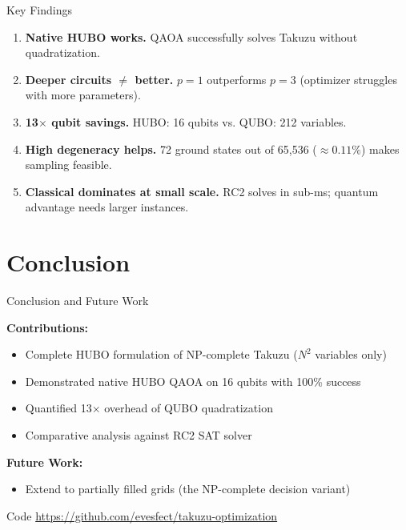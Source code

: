\documentclass[aspectratio=169]{beamer}
\begin{document}
\begin{frame}{Key Findings}

\begin{enumerate}
    \item \textbf{Native HUBO works.} QAOA successfully solves Takuzu without quadratization.
    
    \bigskip
    \item \textbf{Deeper circuits $\neq$ better.} $p=1$ outperforms $p=3$ (optimizer struggles with more parameters).
    
    \bigskip
    \item \textbf{13$\times$ qubit savings.} HUBO: 16 qubits vs. QUBO: 212 variables.
    
    \bigskip
    \item \textbf{High degeneracy helps.} 72 ground states out of 65,536 ($\approx 0.11\%$) makes sampling feasible.
    
    \bigskip
    \item \textbf{Classical dominates at small scale.} RC2 solves in sub-ms; quantum advantage needs larger instances.
\end{enumerate}
\end{frame}

\section{Conclusion}

\begin{frame}{Conclusion and Future Work}

\textbf{Contributions:}
\begin{itemize}
    \item Complete HUBO formulation of NP-complete Takuzu ($N^2$ variables only)
    \item Demonstrated native HUBO QAOA on 16 qubits with 100\% success
    \item Quantified 13$\times$ overhead of QUBO quadratization
    \item Comparative analysis against RC2 SAT solver
\end{itemize}

\bigskip
\textbf{Future Work:}
\begin{itemize}
    \item Extend to partially filled grids (the NP-complete decision variant)
\end{itemize}

\bigskip
\begin{block}{Code}
\url{https://github.com/evesfect/takuzu-optimization}
\end{block}
\end{frame}
\end{document}
